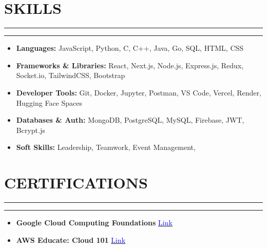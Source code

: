 \documentclass[a4paper]{article}
\newcommand{\sectionline}{
   \vspace{-2em} %
    \noindent\rule{\textwidth}{0.4pt}
    \vspace{0em} %
}
\newcommand{\verticalInd}{
   \vspace{-0.9em} %
    \noindent\rule{\textwidth}{0pt}
    \vspace{0em} %
}
\begin{document}
\vspace{-1.25em}

\section*{SKILLS}
\sectionline
\verticalInd
\vspace{-2em}
\begin{itemize}[leftmargin=*]
    \item \textbf{Languages:} JavaScript, Python, C, C++, Java, Go, SQL, HTML, CSS 
    \vspace{-0.5em}
    \item \textbf{Frameworks \& Libraries:} React, Next.js, Node.js, Express.js, Redux, Socket.io, TailwindCSS, Bootstrap 
    \vspace{-0.5em}
    \item \textbf{Developer Tools:} Git, Docker, Jupyter, Postman, VS Code, Vercel, Render, Hugging Face Spaces
    \vspace{-0.5em}
    \item \textbf{Databases \& Auth:} MongoDB, PostgreSQL, MySQL, Firebase, JWT, Bcrypt.js
    \vspace{-0.5em}
    \item \textbf{Soft Skills:} Leadership, Teamwork, Event Management, 
    \vspace{-0.5em}
\end{itemize}

\vspace{-0.75em}

\section*{CERTIFICATIONS}
\sectionline
\verticalInd
\vspace{-2em}
\begin{itemize}[leftmargin=*]
    \item \textbf{Google Cloud Computing Foundations} \hfill \href{https://www.credly.com/badges/bffe6264-46ba-47cc-ba7b-d819015e2081/public_url}{\textcolor{blue}{Link}} 
    \vspace{-0.5em}
    \item \textbf{AWS Educate: Cloud 101} \hfill \href{https://www.credly.com/badges/bffe6264-46ba-47cc-ba7b-d819015e2081/public_url}{\textcolor{blue}{Link}} 
    \vspace{-0.5em}
\end{itemize}
\end{document}

